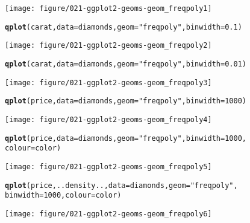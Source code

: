 \documentclass[a4paper,titlepage]{tufte-handout}\usepackage[]{graphicx}\usepackage[]{color}
\makeatletter
\def\maxwidth{ %
  \ifdim\Gin@nat@width>\linewidth
    \linewidth
  \else
    \Gin@nat@width
  \fi
}
\newcommand{\hlnum}[1]{\textcolor[rgb]{0.686,0.059,0.569}{#1}}%
\newcommand{\hlstr}[1]{\textcolor[rgb]{0.192,0.494,0.8}{#1}}%
\newcommand{\hlstd}[1]{\textcolor[rgb]{0.345,0.345,0.345}{#1}}%
\newcommand{\hlkwc}[1]{\textcolor[rgb]{0.333,0.667,0.333}{#1}}%
\newcommand{\hlkwd}[1]{\textcolor[rgb]{0.737,0.353,0.396}{\textbf{#1}}}%
\newenvironment{kframe}{%
 \def\at@end@of@kframe{}%
 \ifinner\ifhmode%
  \def\at@end@of@kframe{\end{minipage}}%
  \begin{minipage}{\columnwidth}%
 \fi\fi%
 \def\FrameCommand##1{\hskip\@totalleftmargin \hskip-\fboxsep
 \colorbox{shadecolor}{##1}\hskip-\fboxsep
     \hskip-\linewidth \hskip-\@totalleftmargin \hskip\columnwidth}%
 \MakeFramed {\advance\hsize-\width
   \@totalleftmargin\z@ \linewidth\hsize
   \@setminipage}}%
 {\par\unskip\endMakeFramed%
 \at@end@of@kframe}
\newenvironment{knitrout}{}{} %
\makeatother
\begin{document}
\begin{knitrout}
\begin{kframe}
{\ttfamily\noindent\itshape\color{messagecolor}{\#\# stat\_bin: binwidth defaulted to range/30. Use 'binwidth = x' to adjust this.}}\end{kframe}
\texttt{[image: figure/021-ggplot2-geoms-geom\_freqpoly1]} 
\begin{kframe}\begin{alltt}
\hlkwd{qplot}\hlstd{(carat,} \hlkwc{data} \hlstd{= diamonds,} \hlkwc{geom} \hlstd{=} \hlstr{"freqpoly"}\hlstd{,} \hlkwc{binwidth} \hlstd{=} \hlnum{0.1}\hlstd{)}
\end{alltt}
\end{kframe}
\texttt{[image: figure/021-ggplot2-geoms-geom\_freqpoly2]} 
\begin{kframe}\begin{alltt}
\hlkwd{qplot}\hlstd{(carat,} \hlkwc{data} \hlstd{= diamonds,} \hlkwc{geom} \hlstd{=} \hlstr{"freqpoly"}\hlstd{,} \hlkwc{binwidth} \hlstd{=} \hlnum{0.01}\hlstd{)}
\end{alltt}
\end{kframe}
\texttt{[image: figure/021-ggplot2-geoms-geom\_freqpoly3]} 
\begin{kframe}\begin{alltt}
\hlkwd{qplot}\hlstd{(price,} \hlkwc{data} \hlstd{= diamonds,} \hlkwc{geom} \hlstd{=} \hlstr{"freqpoly"}\hlstd{,} \hlkwc{binwidth} \hlstd{=} \hlnum{1000}\hlstd{)}
\end{alltt}
\end{kframe}
\texttt{[image: figure/021-ggplot2-geoms-geom\_freqpoly4]} 
\begin{kframe}\begin{alltt}
\hlkwd{qplot}\hlstd{(price,} \hlkwc{data} \hlstd{= diamonds,} \hlkwc{geom} \hlstd{=} \hlstr{"freqpoly"}\hlstd{,} \hlkwc{binwidth} \hlstd{=} \hlnum{1000}\hlstd{,}
  \hlkwc{colour} \hlstd{= color)}
\end{alltt}
\end{kframe}
\texttt{[image: figure/021-ggplot2-geoms-geom\_freqpoly5]} 
\begin{kframe}\begin{alltt}
\hlkwd{qplot}\hlstd{(price, ..density..,} \hlkwc{data} \hlstd{= diamonds,} \hlkwc{geom} \hlstd{=} \hlstr{"freqpoly"}\hlstd{,}
  \hlkwc{binwidth} \hlstd{=} \hlnum{1000}\hlstd{,} \hlkwc{colour} \hlstd{= color)}
\end{alltt}
\end{kframe}
\texttt{[image: figure/021-ggplot2-geoms-geom\_freqpoly6]} 

\end{knitrout}
\end{document}
